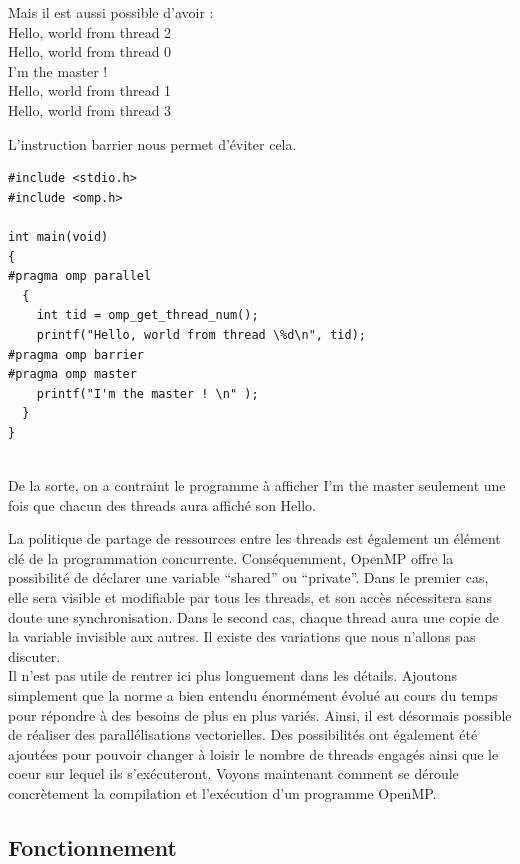 \documentclass{report}
\begin{document}
Mais il est aussi possible d'avoir :
\\Hello, world from thread 2
\\Hello, world from thread 0
\\ I'm the master ! 
\\Hello, world from thread 1
\\Hello, world from thread 3

 L'instruction barrier nous permet d'éviter cela.
\begin{lstlisting}
#include <stdio.h>
#include <omp.h>

int main(void)
{
#pragma omp parallel
  {
    int tid = omp_get_thread_num();
    printf("Hello, world from thread \%d\n", tid);
#pragma omp barrier
#pragma omp master
    printf("I'm the master ! \n" );
  }
}


\end{lstlisting}

De la sorte, on a contraint le programme à afficher I'm the master seulement une fois que chacun 
des threads aura affiché son Hello.

La politique de partage de ressources entre les threads est également un élément clé de la programmation
concurrente. Conséquemment, OpenMP offre la possibilité de déclarer une variable ``shared'' ou ``private''.
Dans le premier cas, elle sera visible et modifiable par tous les threads, et son accès nécessitera sans
doute une synchronisation. Dans le second cas, chaque thread aura une copie de la variable invisible aux 
autres. Il existe des variations que nous n'allons pas discuter.
\\Il n'est pas utile de rentrer ici plus longuement dans les détails. Ajoutons simplement que la
norme a bien entendu énormément évolué au cours du temps pour répondre à des besoins de plus en plus
variés. Ainsi, il est désormais possible de réaliser des parallélisations vectorielles. Des possibilités
ont également été ajoutées pour pouvoir changer à loisir le nombre de threads engagés ainsi que le coeur 
sur lequel ils s'exécuteront. Voyons maintenant comment se déroule concrètement la compilation et
l'exécution d'un programme OpenMP.

\subsection{Fonctionnement}
\end{document}
